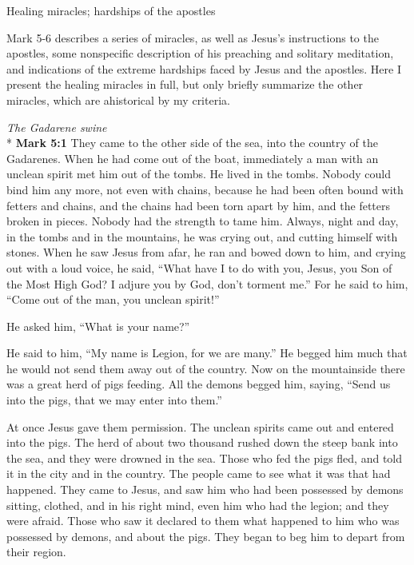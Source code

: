 \documentclass[10pt,twoside]{article} %
\newcommand{\quotesize}{\normalsize{}}
\newcommand{\comm}[1]{\begingroup \color{black!50} #1\endgroup}
\newenvironment{quotetext}{\begingroup\quotesize}{\endgroup}
\newcommand{\intex}[1]{\index[texts]{#1}}
\newcommand{\bible}[2]{\begin{quotetext}\textbf{#1}\intex{#1} #2\end{quotetext}}
\newcommand{\gospelmark}[2]{\bible{Mark #1}{#2}}
\newcommand{\subhead}[1]{\emph{#1}\\*}
\begin{document}
\begin{section}{Healing miracles; hardships of the apostles}

\comm{Mark 5-6 describes a series of miracles, as well as Jesus's instructions to the apostles, some nonspecific description of his
preaching and solitary meditation, and indications of the extreme hardships faced by Jesus and the apostles.
Here I present the healing miracles in full, but only briefly summarize the other miracles, which
are ahistorical by my criteria.}

\subhead{The Gadarene swine}
\gospelmark{5:1}{
   They came to the other side of the sea, into the country of the Gadarenes.   When he had come out of the boat, immediately a man with an unclean spirit met him out of the tombs.   He lived in the tombs. Nobody could bind him any more, not even with chains,   because he had been often bound with fetters and chains, and the chains had been torn apart by him, and the fetters broken in pieces. Nobody had the strength to tame him.   Always, night and day, in the tombs and in the mountains, he was crying out, and cutting himself with stones.   When he saw Jesus from afar, he ran and bowed down to him,   and crying out with a loud voice, he said, ``What have I to do with you, Jesus, you Son of the Most High God? I adjure you by God, don't torment me.''   For he said to him, ``Come out of the man, you unclean spirit!''

  He asked him, ``What is your name?''

He said to him, ``My name is Legion, for we are many.''   He begged him much that he would not send them away out of the country.   Now on the mountainside there was a great herd of pigs feeding.   All the demons begged him, saying, ``Send us into the pigs, that we may enter into them.''

  At once Jesus gave them permission. The unclean spirits came out and entered into the pigs. The herd of about two thousand rushed down the steep bank into the sea, and they were drowned in the sea.   Those who fed the pigs fled, and told it in the city and in the country.
The people came to see what it was that had happened.   They came to Jesus, and saw him who had been possessed by demons sitting, clothed, and in his right mind, even him who had the legion; and they were afraid.   Those who saw it declared to them what happened to him who was possessed by demons, and about the pigs.   They began to beg him to depart from their region.

}
\end{section}
\end{document}
